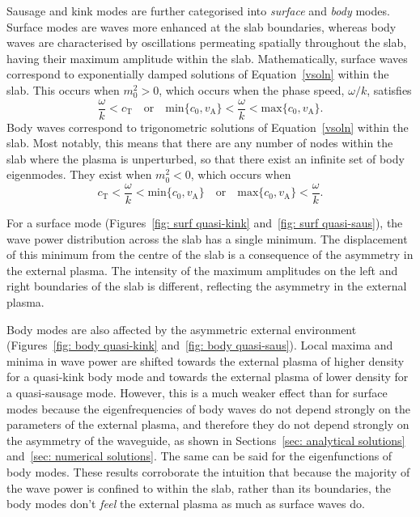 \documentclass[12pt,draft]{../style-files/ociamthesis}
\begin{document}
Sausage and kink modes are further categorised into \textit{surface} and \textit{body} modes. Surface modes are waves more enhanced at the slab boundaries, whereas body waves are characterised by oscillations permeating spatially throughout the slab, having their maximum amplitude within the slab. Mathematically, surface waves correspond to exponentially damped solutions of Equation~\eqref{vsoln} within the slab. This occurs when $m_0^2 > 0$, which occurs when the phase speed, $\omega/k$, satisfies
\begin{equation}
\frac{\omega}{k}<c_\textrm{T} \quad \text{or} \quad \text{min}\{c_0, v_\textrm{A}\}<\frac{\omega}{k}<\text{max}\{c_0, v_\textrm{A}\}.
\end{equation}
Body waves correspond to trigonometric solutions of Equation~\eqref{vsoln} within the slab. Most notably, this means that there are any number of nodes within the slab where the plasma is unperturbed, so that there exist an infinite set of body eigenmodes. They exist when $m_0^2 < 0$, which occurs when
\begin{equation}
c_\textrm{T}<\frac{\omega}{k}<\text{min}\{c_0, v_\textrm{A}\} \quad \text{or} \quad \text{max}\{c_0, v_\textrm{A}\}<\frac{\omega}{k}. \label{bconditions}
\end{equation}

For a surface mode (Figures~\ref{fig: surf quasi-kink} and~\ref{fig: surf quasi-saus}), the wave power distribution across the slab has a single minimum. The displacement of this minimum from the centre of the slab is a consequence of the asymmetry in the external plasma. The intensity of the maximum amplitudes on the left and right boundaries of the slab is different, reflecting the asymmetry in the external plasma.

Body modes are also affected by the asymmetric external environment (Figures~\ref{fig: body quasi-kink} and~\ref{fig: body quasi-saus}). Local maxima and minima in wave power are shifted towards the external plasma of higher density for a quasi-kink body mode and towards the external plasma of lower density for a quasi-sausage mode. However, this is a much weaker effect than for surface modes because the eigenfrequencies of body waves do not depend strongly on the parameters of the external plasma, and therefore they do not depend strongly on the asymmetry of the waveguide, as shown in Sections~\ref{sec: analytical solutions} and~\ref{sec: numerical solutions}. The same can be said for the eigenfunctions of body modes. These results corroborate the intuition that because the majority of the wave power is confined to within the slab, rather than its boundaries, the body modes don't \textit{feel} the external plasma as much as surface waves do.
\end{document}
